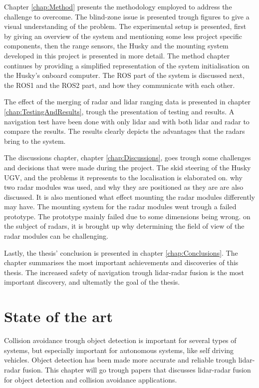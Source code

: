 Chapter \ref{chap:Method} presents the methodology employed to address the challenge to overcome. The blind-zone issue is presented trough figures to give a visual understanding of the problem. The experimental setup is presented, first by giving an overview of the system and mentioning some less project specific components, then the range sensors, the Husky and the mounting system developed in this project is presented in more detail. The method chapter continues by providing a simplified representation of the system initialisation on the Husky's onboard computer. The ROS part of the system is discussed next, the ROS1 and the ROS2 part, and how they communicate with each other. 

The effect of the merging of radar and lidar ranging data is presented in chapter \ref{chap:TestingAndResults}, trough the presentation of testing and results. A navigation test have been done with only lidar and with both lidar and radar to compare the results. The results clearly depicts the advantages that the radars bring to the system. 

The discussions chapter, chapter \ref{chap:Discussions}, goes trough some challenges and decisions that were made during the project. The skid steering of the Husky UGV, and the problems it represents to the localisation is elaborated on. why two radar modules was used, and why they are positioned as they are are also discussed. It is also mentioned what effect mounting the radar modules differently may have. The mounting system for the radar modules went trough a failed prototype. The prototype mainly failed due to some dimensions being wrong. on the subject of radars, it is brought up why determining the field of view of the radar modules can be challenging.

Lastly, the thesis' conclusion is presented in chapter \ref{chap:Conclusions}. The chapter summarises the most important achievements and discoveries of this thesis. The increased safety of navigation trough lidar-radar fusion is the most important discovery, and ultematly the goal of the thesis.

\chapter{State of the art} \label{chap:StateOfTheArt}
Collision avoidance trough object detection is important for several types of systems, but especially important for autonomous systems, like self driving vehicles. Object detection has been made more accurate and reliable trough lidar-radar fusion. This chapter will go trough papers that discusses lidar-radar fusion for object detection and collision avoidance applications. 

